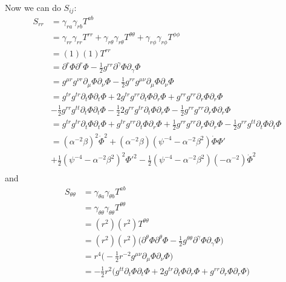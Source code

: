 \documentclass[12pt]{article}
\numberwithin{equation}{section}
\begin{document}
Now we can do $S_{ij}$:
\begin{equation}
\begin{aligned}
S_{rr} &= \gamma_{ra} \gamma_{rb} T^{ab} \\
&= \gamma_{rr} \gamma_{rr} T^{rr} + \gamma_{r \theta} \gamma_{r\theta} T^{\theta \theta} + \gamma_{r\phi} \gamma_{r\phi} T^{\phi \phi} \\
&= (1) (1) T^{rr} \\
&= \partial^r \Phi \partial^r \Phi - \frac{1}{2} g^{r r} \partial^\gamma \Phi \partial_\gamma \Phi \\
&= g^{\mu r} g^{\nu r} \partial_\mu \Phi \partial_\nu \Phi - \frac{1}{2} g^{r r} g^{\mu \nu} \partial_\mu \Phi \partial_\nu \Phi \\
&= g^{t r} g^{t r} \partial_t \Phi \partial_t \Phi + 2 g^{t r} g^{r r} \partial_t \Phi \partial_r \Phi + g^{r r} g^{r r} \partial_r \Phi \partial_r \Phi \\
&- \frac{1}{2} g^{r r} g^{t t} \partial_t \Phi \partial_t \Phi - \frac{1}{2} 2 g^{r r} g^{t r} \partial_t \Phi \partial_r \Phi - \frac{1}{2} g^{r r} g^{r r} \partial_r \Phi \partial_r \Phi\\
&= g^{t r} g^{t r} \partial_t \Phi \partial_t \Phi + g^{t r} g^{r r} \partial_t \Phi \partial_r \Phi + \frac{1}{2} g^{r r} g^{r r} \partial_r \Phi \partial_r \Phi - \frac{1}{2} g^{r r} g^{t t} \partial_t \Phi \partial_t \Phi \\
&= (\alpha^{-2} \beta)^2 \dot{\Phi}^2 + (\alpha^{-2} \beta) (\psi^{-4} - \alpha^{-2} \beta^2) \dot{\Phi} \Phi' \\
&+ \frac{1}{2} (\psi^{-4} - \alpha^{-2} \beta^2)^2 \Phi'^2 - \frac{1}{2} (\psi^{-4} - \alpha^{-2} \beta^2) (-\alpha^{-2}) \dot{\Phi}^2 \\
\end{aligned}
\end{equation}
and
\begin{equation}
\begin{aligned}
S_{\theta \theta} &= \gamma_{\theta a} \gamma_{\theta b} T^{ab} \\
&= \gamma_{\theta \theta} \gamma_{\theta \theta} T^{\theta \theta} \\
&= (r^2) (r^2) T^{\theta \theta} \\
&= (r^2) (r^2) \Big(  \partial^\theta \Phi \partial^\theta \Phi - \frac{1}{2} g^{\theta \theta} \partial^\gamma \Phi \partial_\gamma \Phi \Big) \\
&= r^4 \Big( - \frac{1}{2} r^{-2} g^{\mu \nu} \partial_\mu \Phi \partial_\nu \Phi \Big) \\
&= - \frac{1}{2} r^2 \Big( g^{t t} \partial_t \Phi \partial_t \Phi + 2 g^{t r} \partial_t \Phi \partial_r \Phi + g^{r r} \partial_r \Phi \partial_r \Phi \Big) \\
\end{aligned}
\end{equation}
\end{document}
